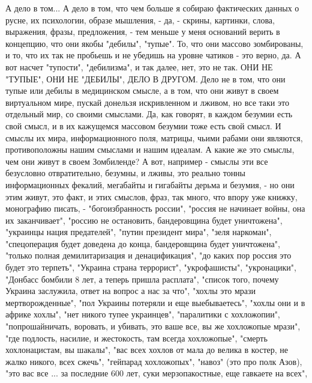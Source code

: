 А дело в том... А дело в том, что чем больше я собираю фактических данных о
русне, их психологии, образе мышления, - да, - скрины, картинки, слова,
выражения, фразы, предложения, - тем меньше у меня оснований верить в
концепцию, что они якобы "дебилы", "тупые". То, что они массово зомбированы, и
то, что их так не пробьешь и не убедишь на уровне чатиков - это верно, да. А
вот насчет "тупости", "дебилизма", и так далее, нет, это не так. ОНИ НЕ
"ТУПЫЕ", ОНИ НЕ "ДЕБИЛЫ", ДЕЛО В ДРУГОМ. Дело не в том, что они тупые или
дебилы в медицинском смысле, а в том, что они живут в своем виртуальном мире,
пускай донельзя искривленном и лживом, но все таки это отдельный мир, со своими
смыслами. Да, как говорят, в каждом безумии есть свой смысл, и в их кажущемся
массовом безумии тоже есть свой смысл. И смыслы их мира, информационного поля,
матрицы, чьими рабами они являются, противоположны нашим смыслами и нашим
идеалам. А какие же это смыслы, чем они живут в своем Зомбиленде?  А вот,
например - смыслы эти все безусловно отвратительно, безумны, и лживы, это
реально тонны информационных фекалий, мегабайты и гигабайты дерьма и безумия, -
но они этим живут, это факт, и этих смыслов, фраз, так много, что впору уже
книжку, монографию писать, - "богоизбранность россии", "россия не начинает
войны, она их заканчивает", "россию не остановить, бандеровщина будет
уничтожена", "украинцы нация предателей", "путин президент мира", "зеля
наркоман", "спецоперация будет доведена до конца, бандеровщина будет
уничтожена", "только полная демилитаризация и денацификация", "до каких пор
россия это будет это терпеть", "Украина страна террорист", "укрофашисты",
"укронацики", "Донбасс бомбили 8 лет, а теперь пришла расплата", "список того,
почему Украина заслужила, ответ на вопрос а нас за что", "хохлы это мрази
мертворожденные", "пол Украины потеряли и еще выебываетесь", "хохлы они и в
африке хохлы", "нет никого тупее украинцев", "паралитики с хохложопии",
"попрошайничать, воровать, и убивать, это ваше все, вы же хохложопые мрази",
"где подлость, насилие, и жестокость, там всегда хохложопые", "смерть
хохлонацистам, вы шакалы", "вас всех хохлов от мала до велика в костер, не
жалко никого, всех сжечь", "гейпарад хохложопых", "навоз" (это про полк Азов),
"это вас все ... за последние 600 лет, суки мерзопакостные, еще гавкаете на
всех", 






